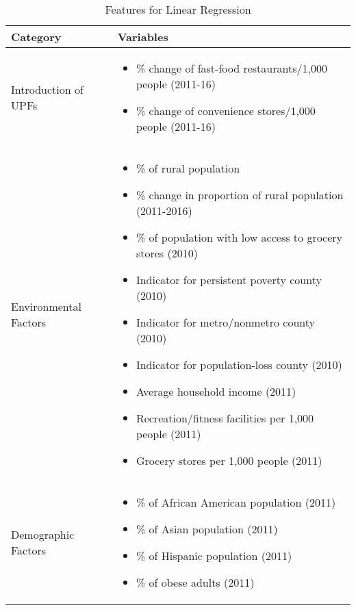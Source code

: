 \documentclass[letterpaper, 11pt]{report}
\begin{document}
\begin{table}[h]
\centering
\caption{Features for Linear Regression}
\begin{tabularx}{\textwidth}{|p{}|X|}
\hline
\textbf{Category} & \textbf{Variables}                                        \\ \hline
Introduction of UPFs & \vspace{-0.3cm} \begin{itemize}
    \item \% change of fast-food restaurants/1,000 people (2011-16) \cite{foodenvatlas}
    \item \% change of convenience stores/1,000 people  (2011-16) \cite{foodenvatlas}
\end{itemize} \\ \hline
Environmental Factors & \vspace{-0.3cm} 
\begin{itemize}
    \item \% of rural population \cite{countyhealthrankings}
    \item \% change in proportion of rural population  (2011-2016) \cite{countyhealthrankings}
    \item \% of population with low access to grocery stores (2010) \cite{foodenvatlas}
    \item Indicator for persistent poverty county (2010) \cite{foodenvatlas}
    \item Indicator for metro/nonmetro county (2010) \cite{foodenvatlas}
    \item Indicator for population-loss county (2010) \cite{foodenvatlas}
    \item Average household income (2011) \cite{countyhealthrankings}
    \item Recreation/fitness facilities per 1,000 people (2011) \cite{foodenvatlas}
    \item Grocery stores per 1,000 people (2011) \cite{foodenvatlas}
\end{itemize} \\ \hline
Demographic Factors & \vspace{-0.3cm} \begin{itemize}
    \item \% of African American population (2011) \cite{countyhealthrankings}
    \item \% of Asian population (2011) \cite{countyhealthrankings}
    \item \% of Hispanic population (2011) \cite{countyhealthrankings}
    \item \% of obese adults (2011) \cite{countyhealthrankings}

\end{itemize}
\end{tabularx}
\end{table}
\end{document}
